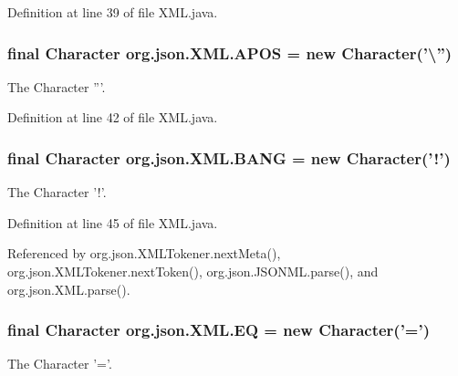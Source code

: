 Definition at line 39 of file X\-M\-L.\-java.

\hypertarget{classorg_1_1json_1_1_x_m_l_afc1bccac3be808ee0cc80e6c5261226a}{
\subsubsection[{A\-P\-O\-S}]{\setlength{\rightskip}{0pt plus 5cm}final Character org.\-json.\-X\-M\-L.\-A\-P\-O\-S = new Character('\textbackslash{}'')\hspace{0.3cm}{\ttfamily [static]}}}\label{classorg_1_1json_1_1_x_m_l_afc1bccac3be808ee0cc80e6c5261226a}
The Character '''. 

Definition at line 42 of file X\-M\-L.\-java.

\hypertarget{classorg_1_1json_1_1_x_m_l_a15eadac312b9e5b2d8590be2d92cc24f}{
\subsubsection[{B\-A\-N\-G}]{\setlength{\rightskip}{0pt plus 5cm}final Character org.\-json.\-X\-M\-L.\-B\-A\-N\-G = new Character('!')\hspace{0.3cm}{\ttfamily [static]}}}\label{classorg_1_1json_1_1_x_m_l_a15eadac312b9e5b2d8590be2d92cc24f}
The Character '!'. 

Definition at line 45 of file X\-M\-L.\-java.



Referenced by org.\-json.\-X\-M\-L\-Tokener.\-next\-Meta(), org.\-json.\-X\-M\-L\-Tokener.\-next\-Token(), org.\-json.\-J\-S\-O\-N\-M\-L.\-parse(), and org.\-json.\-X\-M\-L.\-parse().

\hypertarget{classorg_1_1json_1_1_x_m_l_a79c30d409011e7c5bbffe3a9dd487b19}{
\subsubsection[{E\-Q}]{\setlength{\rightskip}{0pt plus 5cm}final Character org.\-json.\-X\-M\-L.\-E\-Q = new Character('=')\hspace{0.3cm}{\ttfamily [static]}}}\label{classorg_1_1json_1_1_x_m_l_a79c30d409011e7c5bbffe3a9dd487b19}
The Character '='. 


